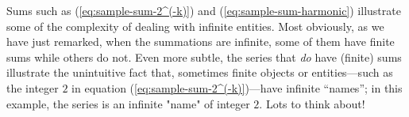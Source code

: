 \noindent {}
\medskip

Sums such as (\ref{eq:sample-sum-2^(-k)}) and
(\ref{eq:sample-sum-harmonic}) illustrate some of the complexity of
dealing with infinite entities.  Most obviously, as we have just
remarked, when the summations are infinite, some of them have finite sums
while others do not.  Even more subtle, the series that {\em do} have
(finite) sums illustrate the unintuitive fact that, sometimes finite
objects or entities---such as the integer $2$ in equation
(\ref{eq:sample-sum-2^(-k)})---have infinite ``names''; in this example, the
series is an infinite "name" of integer $2$.  Lots to think about!
\medskip

